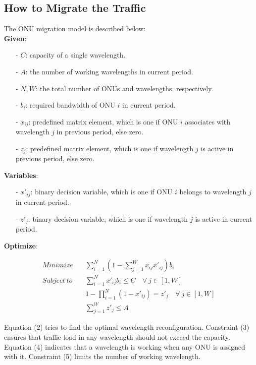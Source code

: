 \documentclass[letter]{IEEEtran}
\begin{document}
\subsection{How to Migrate the Traffic}
The ONU migration model is described below:\\
\textbf{Given}:
\begin{itemize}
	\item[-] $ C $: capacity of a single wavelength.
	\item[-]$ A $: the number of working wavelengths in current period.
	\item[-]$ N, W $: the total number of ONUs and wavelengths, respectively.
	\item[-]$ b_{i} $: required bandwidth of ONU $ i $ in current period.
	\item[-]$ x_{ij} $: predefined matrix element, which is one if ONU $ i $ associates with wavelength $ j $ in previous period, else zero.
	\item[-]$ z_{j} $: predefined matrix element, which is one if wavelength $ j $ is active in previous period, else zero.
\end{itemize}
\textbf{Variables}:
\begin{itemize}
	\item[-]$ x'_{ij} $: binary decision variable, which is one if ONU $ i $ belongs to wavelength $ j $ in current period.
	\item[-]$ z'_{j} $: binary decision variable, which is one if wavelength $ j $ is active in current period.
\end{itemize}
\textbf{Optimize}:
\begin{footnotesize}
\begin{align*}
Minimize \quad	&\sum_{i=1}^{N}(1-\sum_{j=1}^{W}x_{ij}x'_{ij})b_{i} \tag{$2$}\\
Subject \ to \quad    & \sum_{i=1}^{N}x'_{ij}b_{i} \leq C \quad \forall \ j \in [1,W] \tag{$3$} \\
    &1- \prod_{i=1}^{N}{(1 - x'_{ij})} = z'_{j} \quad \forall \ j \in [1,W] \tag{$4$} \\
    & \sum_{j=1}^{W}z'_j \leq A \tag{$5$}
\end{align*}
\end{footnotesize}

Equation (2) tries to find the optimal wavelength reconfiguration. Constraint (3) ensures that traffic load in any wavelength should not exceed the capacity. Equation (4) indicates that a wavelength is working when any ONU is assigned with it. Constraint (5) limits the number of working wavelength.
\end{document}

